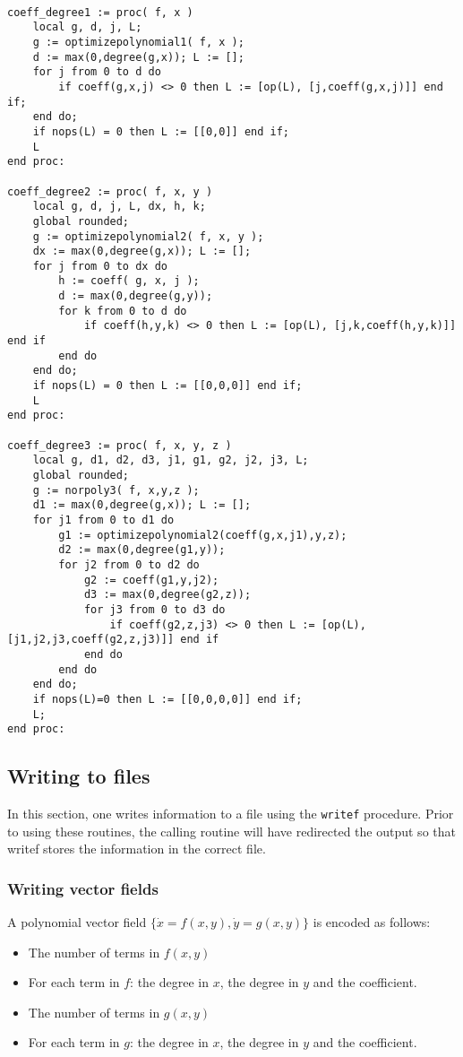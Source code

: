 \documentclass[a4paper,10pt]{article}
\begin{document}
\begin{lstlisting}[name=writelog]

coeff_degree1 := proc( f, x )
    local g, d, j, L;
    g := optimizepolynomial1( f, x );
    d := max(0,degree(g,x)); L := [];
    for j from 0 to d do
        if coeff(g,x,j) <> 0 then L := [op(L), [j,coeff(g,x,j)]] end if;
    end do;
    if nops(L) = 0 then L := [[0,0]] end if;
    L
end proc:

coeff_degree2 := proc( f, x, y )
    local g, d, j, L, dx, h, k;
    global rounded;
    g := optimizepolynomial2( f, x, y );
    dx := max(0,degree(g,x)); L := [];
    for j from 0 to dx do
        h := coeff( g, x, j );
        d := max(0,degree(g,y));
        for k from 0 to d do
            if coeff(h,y,k) <> 0 then L := [op(L), [j,k,coeff(h,y,k)]] end if
        end do
    end do;
    if nops(L) = 0 then L := [[0,0,0]] end if;
    L
end proc:

coeff_degree3 := proc( f, x, y, z )
    local g, d1, d2, d3, j1, g1, g2, j2, j3, L;
    global rounded;
    g := norpoly3( f, x,y,z );
    d1 := max(0,degree(g,x)); L := [];
    for j1 from 0 to d1 do
        g1 := optimizepolynomial2(coeff(g,x,j1),y,z);
        d2 := max(0,degree(g1,y));
        for j2 from 0 to d2 do
            g2 := coeff(g1,y,j2);
            d3 := max(0,degree(g2,z));
            for j3 from 0 to d3 do
                if coeff(g2,z,j3) <> 0 then L := [op(L), [j1,j2,j3,coeff(g2,z,j3)]] end if
            end do
        end do
    end do;
    if nops(L)=0 then L := [[0,0,0,0]] end if;
    L;
end proc:
\end{lstlisting}

\subsection{Writing to files}

In this section, one writes information to a file using the \verb+writef+ procedure.  Prior
to using these routines, the calling routine will have redirected the output so that writef
stores the information in the correct file.

\subsubsection{Writing vector fields}

A polynomial vector field $\{\dot{x} = f(x,y), \dot{y} = g(x,y)\}$ is encoded as follows:
\begin{itemize}
\item
    The number of terms in $f(x,y)$
\item
    For each term in $f$: the degree in $x$, the degree in $y$ and the coefficient.
\item
    The number of terms in $g(x,y)$
\item
    For each term in $g$: the degree in $x$, the degree in $y$ and the coefficient.
\end{itemize}
\end{document}

